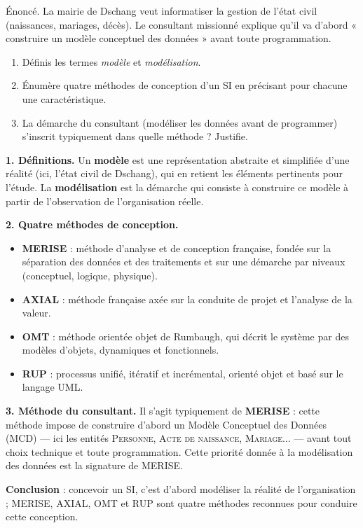 \documentclass[11pt]{article}
\begin{document}
\begin{exoresolu}
Énoncé. La mairie de Dschang veut informatiser la gestion de l'état civil (naissances, mariages, décès). Le consultant missionné explique qu'il va d'abord « construire un modèle conceptuel des données » avant toute programmation.
\begin{enumerate}
\item Définis les termes \emph{modèle} et \emph{modélisation}.
\item Énumère quatre méthodes de conception d'un SI en précisant pour chacune une caractéristique.
\item La démarche du consultant (modéliser les données avant de programmer) s'inscrit typiquement dans quelle méthode ? Justifie.
\end{enumerate}
\tcblower
\textbf{1. Définitions.} Un \textbf{modèle} est une représentation abstraite et simplifiée d'une réalité (ici, l'état civil de Dschang), qui en retient les éléments pertinents pour l'étude. La \textbf{modélisation} est la démarche qui consiste à construire ce modèle à partir de l'observation de l'organisation réelle.

\textbf{2. Quatre méthodes de conception.}
\begin{itemize}
\item \textbf{MERISE} : méthode d'analyse et de conception française, fondée sur la séparation des données et des traitements et sur une démarche par niveaux (conceptuel, logique, physique).
\item \textbf{AXIAL} : méthode française axée sur la conduite de projet et l'analyse de la valeur.
\item \textbf{OMT} : méthode orientée objet de Rumbaugh, qui décrit le système par des modèles d'objets, dynamiques et fonctionnels.
\item \textbf{RUP} : processus unifié, itératif et incrémental, orienté objet et basé sur le langage UML.
\end{itemize}
\textbf{3. Méthode du consultant.} Il s'agit typiquement de \textbf{MERISE} : cette méthode impose de construire d'abord un Modèle Conceptuel des Données (MCD) — ici les entités \textsc{Personne}, \textsc{Acte de naissance}, \textsc{Mariage}... — avant tout choix technique et toute programmation. Cette priorité donnée à la modélisation des données est la signature de MERISE.

\textbf{Conclusion} : concevoir un SI, c'est d'abord modéliser la réalité de l'organisation ; MERISE, AXIAL, OMT et RUP sont quatre méthodes reconnues pour conduire cette conception.
\end{exoresolu}
\end{document}

